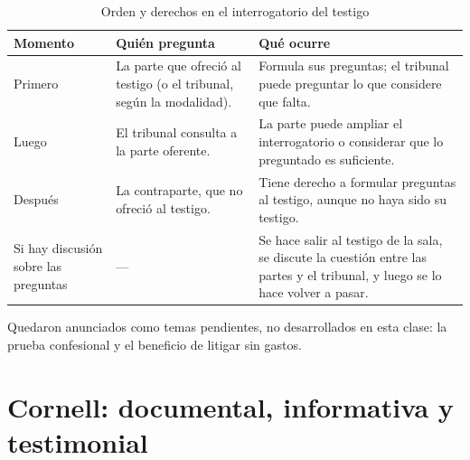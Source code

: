 \documentclass[12pt,oneside]{book}
\begin{document}
\begin{table}[H]
\centering
\caption{Orden y derechos en el interrogatorio del testigo}
\begin{tabularx}{\textwidth}{>{\raggedright\arraybackslash}p{} >{\raggedright\arraybackslash}p{} X}
\toprule
\textbf{Momento} & \textbf{Quién pregunta} & \textbf{Qué ocurre} \\
\midrule
Primero & La parte que ofreció al testigo (o el tribunal, según la modalidad). & Formula sus preguntas; el tribunal puede preguntar lo que considere que falta. \\
Luego & El tribunal consulta a la parte oferente. & La parte puede ampliar el interrogatorio o considerar que lo preguntado es suficiente. \\
Después & La contraparte, que no ofreció al testigo. & Tiene derecho a formular preguntas al testigo, aunque no haya sido su testigo. \\
Si hay discusión sobre las preguntas & --- & Se hace salir al testigo de la sala, se discute la cuestión entre las partes y el tribunal, y luego se lo hace volver a pasar. \\
\bottomrule
\end{tabularx}
\end{table}

\begin{note}
Quedaron anunciados como temas pendientes, no desarrollados en esta clase: la prueba confesional y el beneficio de litigar sin gastos.
\end{note}

\section*{Cornell: documental, informativa y testimonial}
\end{document}
